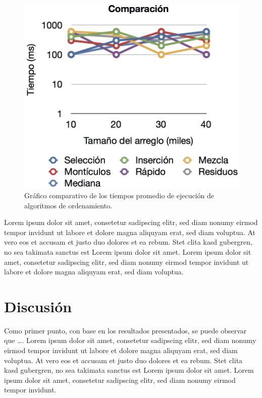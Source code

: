 \documentclass[twocolumn,english,spanish,journal]{IEEEtran}
\begin{document}
\begin{figure}[h!]
\begin{centering}
\includegraphics[scale=0.6]{log}
\par\end{centering}

\caption{Gráfico comparativo de los tiempos promedio de ejecución de algoritmos de ordenamiento.\label{fig:log}}
\end{figure}


Lorem ipsum dolor sit amet, consetetur sadipscing elitr, sed diam nonumy eirmod tempor invidunt ut labore et dolore magna aliquyam erat, sed diam voluptua. At vero eos et accusam et justo duo dolores et ea rebum. Stet clita kasd gubergren, no sea takimata sanctus est Lorem ipsum dolor sit amet. Lorem ipsum dolor sit amet, consetetur sadipscing elitr, sed diam nonumy eirmod tempor invidunt ut labore et dolore magna aliquyam erat, sed diam voluptua.

\section{Discusión}

Como primer punto, con base en los resultados presentados, se puede observar que \dots{}. Lorem ipsum dolor sit amet, consetetur sadipscing elitr, sed diam nonumy eirmod tempor invidunt ut labore et dolore magna aliquyam erat, sed diam voluptua. At vero eos et accusam et justo duo dolores et ea rebum. Stet clita kasd gubergren, no sea takimata sanctus est Lorem ipsum dolor sit amet. Lorem ipsum dolor sit amet,
consetetur sadipscing elitr, sed diam nonumy eirmod tempor invidunt.
\end{document}
